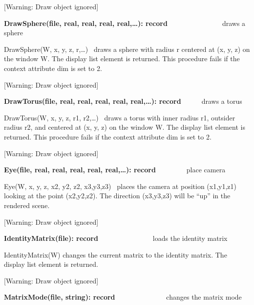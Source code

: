 \documentclass[letterpaper]{article}
\begin{document}
[Warning: Draw object ignored]

{
\textsf{\textbf{DrawSphere(file, real, real, real, real,{\dots}): record}}\ \ \ \ \ \  \ \ \ \ \ \ \ \ \ \ draws a
sphere}


\bigskip

{
\textsf{DrawSphere(W, x, y, z, r,{\dots})} \ draws a sphere with radius r centered at (x, y, z) on the window W. The
display list element is returned. This procedure fails if the context attribute dim is set to 2.}

{
[Warning: Draw object ignored] }

{
\textsf{\textbf{DrawTorus(file, real, real, real, real, real,{\dots}): record}}\ \ \ \ \ \  draws a torus}


\bigskip

{
\textsf{DrawTorus(W, x, y, z, r1, r2,{\dots})} \ draws a torus with inner radius r1, outsider radius r2, and centered at
(x, y, z) on the window W. The display list element is returned. This procedure fails if the context attribute dim is
set to 2.}

[Warning: Draw object ignored]

{
\textsf{\textbf{Eye(file, real, real, real, real, real,{\dots}): record}}\ \ \ \ \ \ \ \  \ place camera}


\bigskip

{
\textsf{Eye(W, x, y, z, x2, y2, z2, x3,y3,z3)} \ places the camera at position (x1,y1,z1) looking at the point
(x2,y2,z2). The direction (x3,y3,z3) will be ``up'' in the rendered scene.}

[Warning: Draw object ignored]

{
\textsf{\textbf{IdentityMatrix(file): record}}\ \ \ \ \ \ \ \ \ \  \ \ \ \ \ \ loads the identity matrix}


\bigskip

{
\textsf{IdentityMatrix(W)} changes the current matrix to the identity matrix. The display list element is returned.}


\bigskip

[Warning: Draw object ignored]

{
\textsf{\textbf{MatrixMode(file, string): record}}\textbf{ \ \ }\ \ \ \ \ \  \ \ \ \ \ \ changes the matrix mode}


\bigskip
\end{document}
